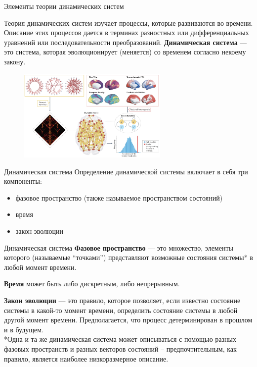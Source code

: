 \begin{frame}{Элементы теории динамических систем}

Теория динамических систем изучает процессы, которые развиваются во времени. 
Описание этих процессов дается в терминах разностных или дифференциальных
уравнений или последовательности преобразований.
\newline{}
\textbf{Динамическая система} --- это система, которая эволюционирует (меняется) со временем согласно некоему закону.
\begin{figure}
    \centering
    \includegraphics[width=0.65\textwidth]{lecture_4/figs/example-2.png}
\end{figure}

\end{frame}
\begin{frame}{Динамическая система}
Определение динамической системы включает в себя три компоненты:
\begin{itemize}
    \item фазовое пространство (также называемое пространством состояний)
    \item время
    \item закон эволюции
\end{itemize}

\begin{figure}
    \centering
\end{figure}

\end{frame}
\begin{frame}{Динамическая система}
\textbf{Фазовое пространство} --- это множество, элементы которого (называемые “точками”) представляют возможные состояния системы* в любой момент времени.

\vspace{0.5cm}
\textbf{Время} может быть либо дискретным, либо непрерывным.

\vspace{0.5cm}
\textbf{Закон эволюции} --- это правило, которое позволяет, если известно состояние системы в какой-то момент времени, определить состояние системы в любой другой момент времени. Предполагается, что процесс детерминирован в прошлом и в будущем. \\
\vspace{0.5cm}
*Одна и та же динамическая система может описываться с помощью разных фазовых пространств и разных векторов состояний -- предпочтительным, как правило, является наиболее низкоразмерное описание.

\end{frame}
